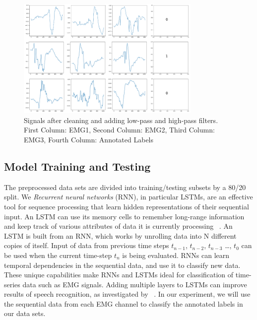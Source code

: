 \documentclass{article}
\begin{document}
\begin{figure}[!t]
\centering
\includegraphics[width=3.5in]{images/cleaned_signals.png}
\caption{Signals after cleaning and adding low-pass and high-pass filters. First Column: EMG1, Second Column: EMG2, Third Column: EMG3, Fourth Column: Annotated Labels}
\label{fig: cleaned_signals}
\end{figure}

\subsection{Model Training and Testing}
\label{ssec:Experimental models}
The preprocessed data sets are divided into training/testing subsets by a 80/20 split. We 
\textit{Recurrent neural networks} (RNN), in particular LSTMs, are an effective tool for sequence processing that learn hidden representations of their sequential input. An LSTM can use its memory cells to remember long-range information and keep track of various attributes of data it is currently processing ~\cite{karpathy_visualizing_2016}. An LSTM is built from an RNN, which works by unrolling data into N different copies of itself. Input of data from previous time steps $t_{n-1}$, $t_{n-2}$, $t_{n-3}$ \ldots, $t_{0}$ can be used when the current time-step $t_{n}$ is being evaluated. RNNs can learn temporal dependencies in the sequential data, and use it to classify new data. These unique capabilities make RNNs and LSTMs ideal for classification of time-series data such as EMG signals. Adding multiple layers to LSTMs can improve results of speech recognition, as investigated by ~\cite{graves_speech_2013}. In our experiment, we will use the sequential data from each EMG channel to classify the annotated labels in our data sets.
\end{document}
